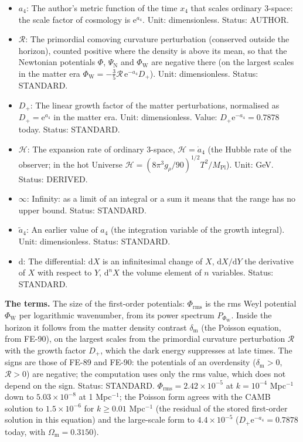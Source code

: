 \documentclass[
  10pt,
]{article}
\begin{document}
\begin{itemize}
  \(\mathrm{e}^{X}\) is the exponential of \(X\). Unit: dimensionless.
  Value: 2.718281828. Status: STANDARD.
\item
  \(a_4\): The author's metric function of the time \(x_4\) that scales
  ordinary 3-space: the scale factor of cosmology is
  \(\mathrm{e}^{a_4}\). Unit: dimensionless. Status: AUTHOR.
\item
  \(\mathcal{R}\): The primordial comoving curvature perturbation
  (conserved outside the horizon), counted positive where the density is
  above its mean, so that the Newtonian potentials \(\Phi\),
  \(\Psi_{\mathrm{N}}\) and \(\Phi_{\mathrm{W}}\) are negative there (on
  the largest scales in the matter era
  \(\Phi_{\mathrm{W}} = -\frac35\mathcal{R}\,\mathrm{e}^{-a_4}D_+\)).
  Unit: dimensionless. Status: STANDARD.
\item
  \(D_+\): The linear growth factor of the matter perturbations,
  normalised as \(D_+ = \mathrm{e}^{a_4}\) in the matter era. Unit:
  dimensionless. Value: \(D_+\mathrm{e}^{-a_4} = 0.7878\) today. Status:
  STANDARD.
\item
  \(\mathcal{H}\): The expansion rate of ordinary 3-space,
  \(\mathcal{H} = \dot a_4\) (the Hubble rate of the observer; in the
  hot Universe
  \(\mathcal{H} = (8\pi^3g_\rho/90)^{1/2}T^2/M_{\mathrm{Pl}}\)). Unit:
  GeV. Status: DERIVED.
\item
  \(\infty\): Infinity: as a limit of an integral or a sum it means that
  the range has no upper bound. Status: STANDARD.
\item
  \(\tilde a_4\): An earlier value of \(a_4\) (the integration variable
  of the growth integral). Unit: dimensionless. Status: STANDARD.
\item
  \(\mathrm{d}\): The differential: \(\mathrm{d}X\) is an infinitesimal
  change of \(X\), \(\mathrm{d}X/\mathrm{d}Y\) the derivative of \(X\)
  with respect to \(Y\), \(\mathrm{d}^nX\) the volume element of \(n\)
  variables. Status: STANDARD.
\end{itemize}

\textbf{The terms.} The size of the first-order potentials:
\(\Phi_{\mathrm{rms}}\) is the rms Weyl potential \(\Phi_{\mathrm{W}}\)
per logarithmic wavenumber, from its power spectrum
\(P_{\Phi_{\mathrm{W}}}\). Inside the horizon it follows from the matter
density contrast \(\delta_{\mathrm{m}}\) (the Poisson equation, from
FE-90), on the largest scales from the primordial curvature perturbation
\(\mathcal{R}\) with the growth factor \(D_+\), which the dark energy
suppresses at late times. The signs are those of FE-89 and FE-90: the
potentials of an overdensity (\(\delta_{\mathrm{m}} > 0\),
\(\mathcal{R} > 0\)) are negative; the computation uses only the rms
value, which does not depend on the sign. Status: STANDARD.
\(\Phi_{\mathrm{rms}} = 2.42\times10^{-5}\) at \(k = 10^{-4}\)
Mpc\(^{-1}\) down to \(5.03\times10^{-8}\) at 1 Mpc\(^{-1}\); the
Poisson form agrees with the CAMB solution to \(1.5\times10^{-6}\) for
\(k \ge 0.01\) Mpc\(^{-1}\) (the residual of the stored first-order
solution in this equation) and the large-scale form to
\(4.4\times10^{-5}\) (\(D_+\mathrm{e}^{-a_4} = 0.7878\) today, with
\(\Omega_{\mathrm{m}} = 0.3150\)).
\end{document}
